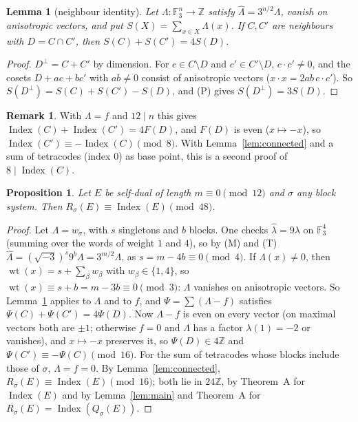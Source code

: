 \documentclass[11pt]{amsart}
\newtheorem{lemma}[theorem]{Lemma}
\newtheorem{proposition}[theorem]{Proposition}
\theoremstyle{definition}
\newtheorem{remark}[theorem]{Remark}
\newcommand{\F}{\mathbb{F}_3}
\newcommand{\Z}{\mathbb{Z}}
\newcommand{\wt}{\operatorname{wt}}
\newcommand{\Index}{\operatorname{Index}}
\newcommand{\isq}{\sqrt{-3}}
\begin{document}
\begin{lemma}[neighbour identity]\label{lem:neighbour}
Let $\Lambda\colon\F^n\to\Z$ satisfy $\hat\Lambda=3^{n/2}\Lambda$, vanish on anisotropic vectors, and
put $S(X)=\sum_{x\in X}\Lambda(x)$. If $C,C'$ are neighbours with $D=C\cap C'$, then
$S(C)+S(C')=4S(D)$.
\end{lemma}

\begin{proof}
$D^\perp=C+C'$ by dimension. For $c\in C\setminus D$ and $c'\in C'\setminus D$, $c\cdot c'\ne0$, and
the cosets $D+ac+bc'$ with $ab\ne0$ consist of anisotropic vectors ($x\cdot x=2ab\,c\cdot c'$). So
$S(D^\perp)=S(C)+S(C')-S(D)$, and (P) gives $S(D^\perp)=3S(D)$.
\end{proof}

\begin{remark}\label{rem:neighbour8}
With $\Lambda=f$ and $12\mid n$ this gives $\Index(C)+\Index(C')=4F(D)$, and $F(D)$ is even ($x\mapsto-x$), so
$\Index(C')\equiv-\Index(C)\pmod8$. With Lemma~\ref{lem:connected} and a sum of tetracodes
(index $0$) as base point, this is a second proof of $8\mid\Index(C)$.
\end{remark}

\begin{proposition}\label{prop:mod48}
Let $E$ be self-dual of length $m\equiv0\pmod{12}$ and $\sigma$ any block system. Then
$R_\sigma(E)\equiv\Index(E)\pmod{48}$.
\end{proposition}

\begin{proof}
Let $\Lambda=w_\sigma$, with $s$ singletons and $b$ blocks. One checks
$\hat\lambda=9\lambda$ on $\F^4$ (summing over the words of weight $1$ and $4$), so by (M) and (T)
$\hat\Lambda=(\isq)^s9^b\Lambda=3^{m/2}\Lambda$, as $s=m-4b\equiv0\pmod4$. If $\Lambda(x)\ne0$, then
$\wt(x)=s+\sum_\beta w_\beta$ with $w_\beta\in\{1,4\}$, so $\wt(x)\equiv s+b=m-3b\equiv0\pmod3$: $\Lambda$
vanishes on anisotropic vectors. So Lemma~\ref{lem:neighbour} applies to $\Lambda$ and to $f$, and
$\Psi=\sum(\Lambda-f)$ satisfies $\Psi(C)+\Psi(C')=4\Psi(D)$. Now $\Lambda-f$ is even on every vector
(on maximal vectors both are $\pm1$; otherwise $f=0$ and $\Lambda$ has a factor $\lambda(1)=-2$ or
vanishes), and $x\mapsto-x$ preserves it, so $\Psi(D)\in4\Z$ and $\Psi(C')\equiv-\Psi(C)\pmod{16}$.
For the sum of tetracodes whose blocks include those of $\sigma$, $\Lambda=f=0$. By
Lemma~\ref{lem:connected}, $R_\sigma(E)\equiv\Index(E)\pmod{16}$; both lie in $24\Z$, by Theorem~A for
$\Index(E)$ and by Lemma~\ref{lem:main} and Theorem~A for $R_\sigma(E)=\Index(Q_\sigma(E))$.
\end{proof}
\end{document}
